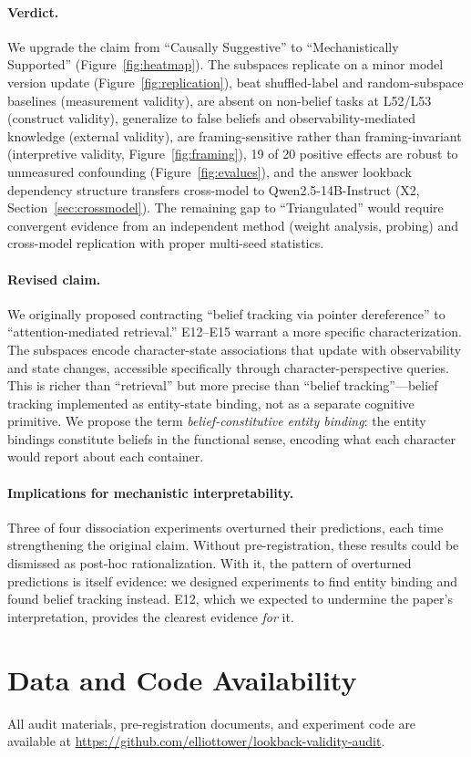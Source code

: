 \documentclass{article}
\begin{document}
\paragraph{Verdict.}
We upgrade the claim from ``Causally Suggestive'' to ``Mechanistically Supported'' (Figure~\ref{fig:heatmap}). The subspaces replicate on a minor model version update (Figure~\ref{fig:replication}), beat shuffled-label and random-subspace baselines (measurement validity), are absent on non-belief tasks at L52/L53 (construct validity), generalize to false beliefs and observability-mediated knowledge (external validity), are framing-sensitive rather than framing-invariant (interpretive validity, Figure~\ref{fig:framing}), 19 of 20 positive effects are robust to unmeasured confounding (Figure~\ref{fig:evalues}), and the answer lookback dependency structure transfers cross-model to Qwen2.5-14B-Instruct (X2, Section~\ref{sec:crossmodel}). The remaining gap to ``Triangulated'' would require convergent evidence from an independent method (weight analysis, probing) and cross-model replication with proper multi-seed statistics.

\paragraph{Revised claim.}
We originally proposed contracting ``belief tracking via pointer dereference'' to ``attention-mediated retrieval.'' E12--E15 warrant a more specific characterization. The subspaces encode character-state associations that update with observability and state changes, accessible specifically through character-perspective queries. This is richer than ``retrieval'' but more precise than ``belief tracking''---belief tracking implemented as entity-state binding, not as a separate cognitive primitive. We propose the term \emph{belief-constitutive entity binding}: the entity bindings constitute beliefs in the functional sense, encoding what each character would report about each container.

\paragraph{Implications for mechanistic interpretability.}
Three of four dissociation experiments overturned their predictions, each time strengthening the original claim. Without pre-registration, these results could be dismissed as post-hoc rationalization. With it, the pattern of overturned predictions is itself evidence: we designed experiments to find entity binding and found belief tracking instead. E12, which we expected to undermine the paper's interpretation, provides the clearest evidence \emph{for} it.


\section*{Data and Code Availability}

All audit materials, pre-registration documents, and experiment code are available at \url{https://github.com/elliottower/lookback-validity-audit}.



\end{document}
